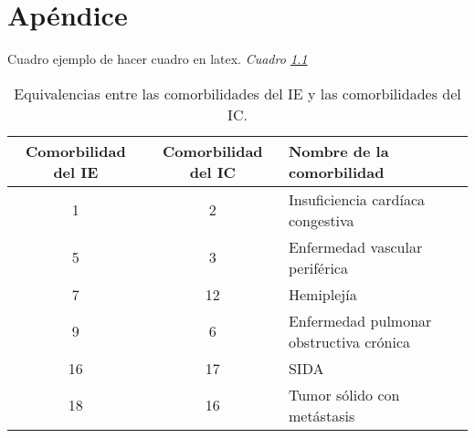 \chapter{Apéndice}
\label{apendices}

Cuadro ejemplo de hacer cuadro en latex.
\textit{Cuadro \ref{equivalenciasIEIC}}

\begin{table}[H]
  \centering
    \begin{tabular}{ccl}
     \hline
     \textbf{Comorbilidad del IE} & \textbf{Comorbilidad del IC} & \textbf{Nombre de la comorbilidad}\\
    \hline
    1     & 2 & Insuficiencia cardíaca congestiva \\
    5     & 3 & Enfermedad vascular periférica \\
    7     & 12 & Hemiplejía \\
    9     & 6 & Enfermedad pulmonar obstructiva crónica \\
    16    & 17 & SIDA  \\
    18    & 16 & Tumor sólido con metástasis \\
    \hline
    \end{tabular}
  \caption{\label{equivalenciasIEIC} Equivalencias entre las comorbilidades del IE y las comorbilidades del IC.}
\end{table}